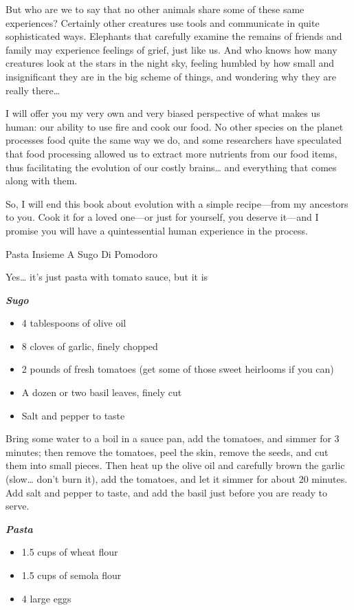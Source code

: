 \documentclass[
]{book}
\begin{document}
But who are we to say that no other animals share some of these same experiences? Certainly other creatures use tools and communicate in quite sophisticated ways. Elephants that carefully examine the remains of friends and family may experience feelings of grief, just like us. And who knows how many creatures look at the stars in the night sky, feeling humbled by how small and insignificant they are in the big scheme of things, and wondering why they are really there\ldots{}

I will offer you my very own and very biased perspective of what makes us human: our ability to use fire and cook our food. No other species on the planet processes food quite the same way we do, and some researchers have speculated that food processing allowed us to extract more nutrients from our food items, thus facilitating the evolution of our costly brains\ldots{} and everything that comes along with them.

So, I will end this book about evolution with a simple recipe---from my ancestors to you. Cook it for a loved one---or just for yourself, you deserve it---and I promise you will have a quintessential human experience in the process.

Pasta Insieme A Sugo Di Pomodoro

Yes\ldots{} it's just pasta with tomato sauce, but it is 🤤

\textbf{\emph{Sugo}}

\begin{itemize}
\item
  4 tablespoons of olive oil
\item
  8 cloves of garlic, finely chopped
\item
  2 pounds of fresh tomatoes (get some of those sweet heirlooms if you can)
\item
  A dozen or two basil leaves, finely cut
\item
  Salt and pepper to taste
\end{itemize}

Bring some water to a boil in a sauce pan, add the tomatoes, and simmer for 3 minutes; then remove the tomatoes, peel the skin, remove the seeds, and cut them into small pieces. Then heat up the olive oil and carefully brown the garlic (slow\ldots{} don't burn it), add the tomatoes, and let it simmer for about 20 minutes. Add salt and pepper to taste, and add the basil just before you are ready to serve.

\textbf{\emph{Pasta}}

\begin{itemize}
\item
  1.5 cups of wheat flour
\item
  1.5 cups of semola flour
\item
  4 large eggs
\end{itemize}
\end{document}
